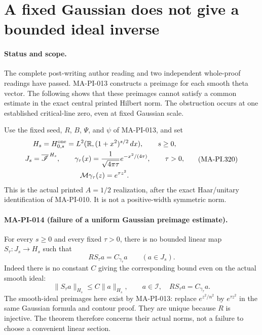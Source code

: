 \section{A fixed Gaussian does not give a bounded ideal inverse}
\label{sec:dense-gaussian-inverse-obstruction}

\paragraph{Status and scope.}
The complete post-writing author reading and two independent
whole-proof readings have passed.
MA-PI-013 constructs a preimage for each smooth theta
vector.  The following shows that these preimages cannot
satisfy a common estimate in the exact central printed
Hilbert norm.  The obstruction occurs at one established
critical-line zero, even at fixed Gaussian scale.

Use the fixed seed, \(R\), \(B\), \(\Psi\), and \(\psi\)
of MA-PI-013, and set
\[
 \begin{gathered}
 H_s=H^{\rm one}_{0,s}
       =L^2(\mathbb R,(1+x^2)^{s/2}\,dx),\qquad s\ge0,\\
 J_s=\overline{\mathscr I}^{\,H_s},\qquad
 \gamma_\tau(x)=\frac1{\sqrt{4\pi\tau}}
                       e^{-x^2/(4\tau)},\qquad \tau>0,\\
 \mathcal M\gamma_\tau(z)=e^{\tau z^2}.
 \end{gathered}
 \tag{MA-PI.320}
\]
This is the actual printed \(A=1/2\) realization, after
the exact Haar/unitary identification of MA-PI-010.
It is not a positive-width symmetric norm.

\paragraph{MA-PI-014 (failure of a uniform Gaussian preimage estimate).}
For every \(s\ge0\) and every fixed \(\tau>0\), there is
no bounded linear map \(S_\tau:J_s\to H_s\) such that
\[
                  RS_\tau a=C_{\gamma_\tau}a
                       \qquad(a\in J_s).
 \tag{MA-PI.321}
\]
Indeed there is no constant \(C\) giving the corresponding
bound even on the actual smooth ideal:
\[
 \|S_\tau a\|_{H_s}\le C\|a\|_{H_s},
       \qquad a\in\mathscr I,\quad
       RS_\tau a=C_{\gamma_\tau}a.
 \tag{MA-PI.322}
\]
The smooth-ideal preimages here exist by MA-PI-013:
replace \(e^{z^2/n^2}\) by \(e^{\tau z^2}\) in the
same Gaussian formula and contour proof.
They are unique because \(R\) is injective.  The theorem
therefore concerns their actual norms, not a failure
to choose a convenient linear section.

